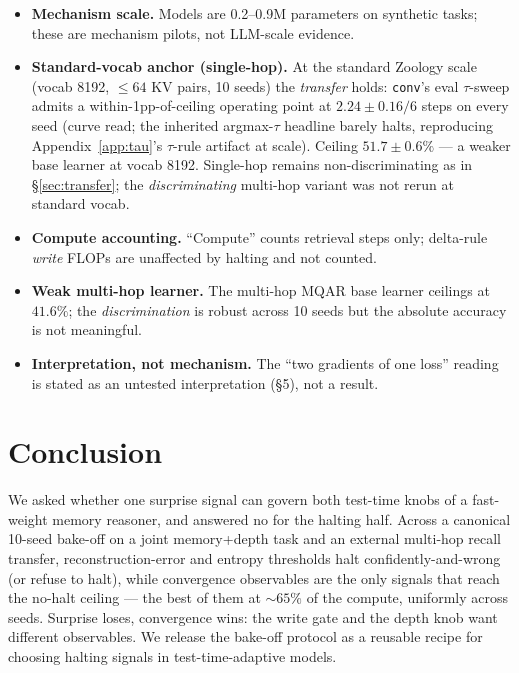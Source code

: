 \documentclass{article}
\newcommand{\sig}[1]{\texttt{#1}}
\begin{document}
\begin{itemize}
  \item \textbf{Mechanism scale.} Models are 0.2--0.9M parameters on synthetic
  tasks; these are mechanism pilots, not LLM-scale evidence.
  \item \textbf{Standard-vocab anchor (single-hop).} At the standard Zoology
  scale (vocab 8192, ${\le}64$ KV pairs, 10 seeds) the \emph{transfer} holds:
  \sig{conv}'s eval $\tau$-sweep admits a within-1pp-of-ceiling operating point
  at $2.24\pm0.16/6$ steps on every seed (curve read; the inherited
  argmax-$\tau$ headline barely halts, reproducing Appendix~\ref{app:tau}'s
  $\tau$-rule artifact at scale). Ceiling $51.7\pm0.6\%$ --- a weaker base
  learner at vocab 8192. Single-hop remains non-discriminating as in
  \S\ref{sec:transfer}; the \emph{discriminating} multi-hop variant was not
  rerun at standard vocab.
  \item \textbf{Compute accounting.} ``Compute'' counts retrieval steps only;
  delta-rule \emph{write} FLOPs are unaffected by halting and not counted.
  \item \textbf{Weak multi-hop learner.} The multi-hop MQAR base learner
  ceilings at $41.6\%$; the \emph{discrimination} is robust across 10 seeds but
  the absolute accuracy is not meaningful.
  \item \textbf{Interpretation, not mechanism.} The ``two gradients of one
  loss'' reading is stated as an untested interpretation (\S5), not a result.
\end{itemize}

\section{Conclusion}

We asked whether one surprise signal can govern both test-time knobs of a
fast-weight memory reasoner, and answered no for the halting half. Across a
canonical 10-seed bake-off on a joint memory+depth task and an external
multi-hop recall transfer, reconstruction-error and entropy thresholds halt
confidently-and-wrong (or refuse to halt), while convergence observables are
the only signals that reach the no-halt ceiling --- the best of them at
${\sim}65\%$ of the compute, uniformly across seeds. Surprise loses,
convergence wins: the write gate and the depth knob want different observables.
We release the bake-off protocol as a reusable recipe for choosing halting
signals in test-time-adaptive models.



\end{document}
